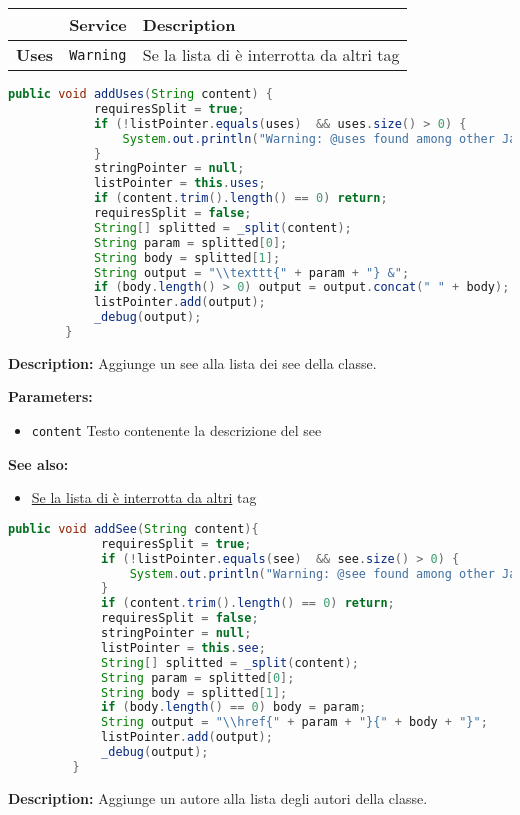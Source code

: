 \begin{table}[!h]\centering
\begin{tabular}{|l|p{}|p{}|}
\hline & \textbf{Service} & \textbf{Description} \\ \hline
\multirow{1}{*}{\textbf{Uses}}
& \texttt{Warning} & Se la lista di è interrotta da altri tag \\
\hline
\end{tabular}\end{table}
\begin{lstlisting}[language=Java]
        public void addUses(String content) {
            requiresSplit = true;
            if (!listPointer.equals(uses)  && uses.size() > 0) {
                System.out.println("Warning: @uses found among other Javadoc keywords. You should put all @uses together.");
            }
            stringPointer = null;
            listPointer = this.uses;
            if (content.trim().length() == 0) return;
            requiresSplit = false;
            String[] splitted = _split(content);
            String param = splitted[0];
            String body = splitted[1];
            String output = "\\texttt{" + param + "} &";
            if (body.length() > 0) output = output.concat(" " + body);
            listPointer.add(output);
            _debug(output);
        }
\end{lstlisting}
\textbf{Description:}  Aggiunge un see alla lista dei see della classe. 

\textbf{Parameters:}
\begin{itemize}
  \item\texttt{content} Testo contenente la descrizione del see  
\end{itemize}

\textbf{See also:}
\begin{itemize}
  \item\href{Warning}{Se la lista di è interrotta da altri} tag
\end{itemize}

\begin{lstlisting}[language=Java]
         public void addSee(String content){
             requiresSplit = true;
             if (!listPointer.equals(see)  && see.size() > 0) {
                 System.out.println("Warning: @see found among other Javadoc keywords. You should put all @see together.");
             }
             if (content.trim().length() == 0) return;
             requiresSplit = false;
             stringPointer = null;
             listPointer = this.see;
             String[] splitted = _split(content);
             String param = splitted[0];
             String body = splitted[1];
             if (body.length() == 0) body = param;
             String output = "\\href{" + param + "}{" + body + "}";
             listPointer.add(output);
             _debug(output);
         }
\end{lstlisting}
\textbf{Description:}  Aggiunge un autore alla lista degli autori della classe. 

